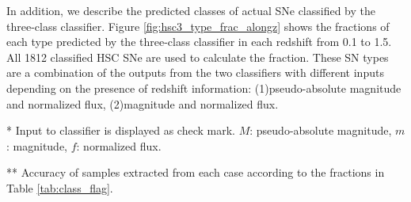 \documentclass[useamsfonts]{pasj01}
\begin{document}
In addition, we describe the predicted classes of actual SNe classified by the three-class classifier.
Figure \ref{fig:hsc3_type_frac_alongz} shows the fractions of each type predicted by the three-class classifier in each redshift from 0.1 to 1.5.
All 1812 classified HSC SNe are used to calculate the fraction.
These SN types are a combination of the outputs from the two classifiers with different inputs depending on the presence of redshift information: (1)pseudo-absolute magnitude and normalized flux, (2)magnitude and normalized flux.

%
%
%
%
\begin{table}[htbp]
\label{tab:h3_validation}
\begin{tabnote}
* Input to classifier is displayed as check mark. $M$: pseudo-absolute magnitude, $m$: magnitude, $f$: normalized flux.

** %
Accuracy of samples extracted from each case according to the fractions in Table \ref{tab:class_flag}.
\end{tabnote}
\end{table}
\end{document}
